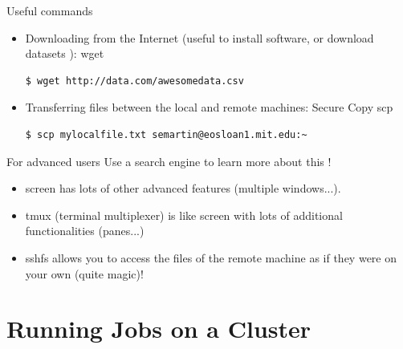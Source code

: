 \documentclass{beamer}
\begin{document}
\begin{frame}[fragile]{Useful commands}
  \begin{itemize}
  \item Downloading from the Internet (useful to install software, or download datasets ): \alert{wget}
  \begin{verbatim}
$ wget http://data.com/awesomedata.csv
  \end{verbatim}
  \item Transferring files between the local and remote machines: Secure Copy \alert{scp}
  \begin{verbatim}
$ scp mylocalfile.txt semartin@eosloan1.mit.edu:~
  \end{verbatim}

  \end{itemize}

  \pause

  \begin{block}{For advanced users}
    Use a search engine to learn more about this !
    \begin{itemize}
      \item \alert{screen} has lots of other advanced features (multiple windows...).
      \item \alert{tmux} (terminal multiplexer) is like screen with lots of additional functionalities (panes...)
      \item \alert{sshfs} allows you to access the files of the remote machine as if they were on your own (quite magic)!
    \end{itemize}

  \end{block}
\end{frame}

\section{Running Jobs on a Cluster}
\end{document}
